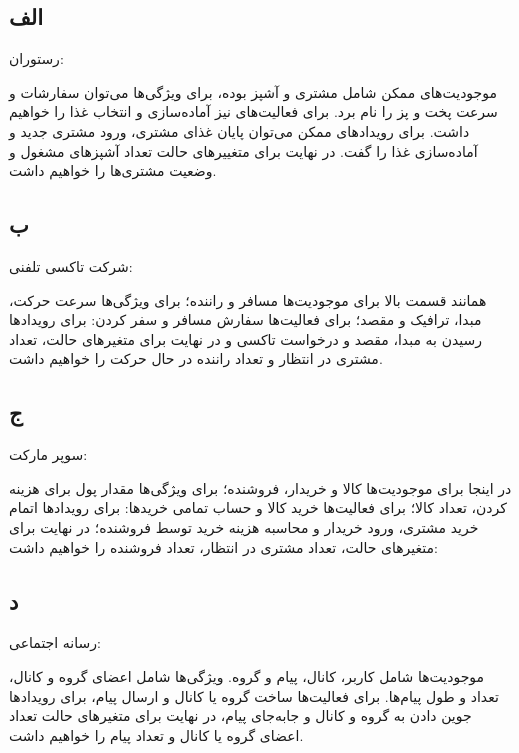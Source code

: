 \subsection*{الف}
رستوران:

موجودیت‌های ممکن شامل مشتری و آشپز بوده، برای ویژگی‌ها می‌توان سفارشات و سرعت پخت و پز را نام برد. برای فعالیت‌های نیز آماده‌سازی و انتخاب غذا را خواهیم داشت. برای رویدادهای ممکن می‌توان پایان غذای مشتری، ورود مشتری جدید و آماده‌سازی غذا را گفت. در نهایت برای متغییرهای حالت تعداد آشپزهای مشغول و وضعیت مشتری‌ها را خواهیم داشت.

\subsection*{ب}
شرکت تاکسی تلفنی:

همانند قسمت بالا برای موجودیت‌ها مسافر و راننده؛ برای ویژگی‌ها سرعت حرکت، مبدا، ترافیک و مقصد؛ برای فعالیت‌ها سفارش مسافر و سفر کردن: برای رویدادها رسیدن به مبدا، مقصد و درخواست تاکسی و در نهایت برای متغیرهای حالت، تعداد مشتری در انتظار و تعداد راننده در حال حرکت را خواهیم داشت.

\subsection*{ج}
سوپر مارکت:


در اینجا برای موجودیت‌ها کالا و خریدار، فروشنده؛ برای ویژگی‌ها مقدار پول برای هزینه کردن، تعداد کالا؛ برای فعالیت‌ها خرید کالا و حساب تمامی خریدها: برای رویدادها اتمام خرید مشتری، ورود خریدار و محاسبه هزینه خرید توسط فروشنده؛ در نهایت برای متغیرهای حالت، تعداد مشتری در انتظار، تعداد فروشنده را خواهیم داشت:

\subsection*{د}
رسانه اجتماعی:

موجودیت‌ها شامل کاربر، کانال، پیام و گروه. ویژگی‌ها شامل اعضای گروه و کانال، تعداد و طول پیام‌ها. برای فعالیت‌ها ساخت گروه یا کانال و ارسال پیام، برای رویدادها جوین دادن به گروه و کانال و جابه‌جای پیام، در نهایت برای متغیرهای حالت تعداد اعضای گروه یا کانال و تعداد پیام را خواهیم داشت.
